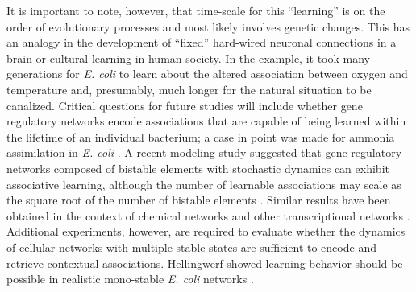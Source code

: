 It is important to note, however, that time-scale for this ``learning'' is on the order of evolutionary processes and most likely involves genetic changes. This has an analogy in the development of ``fixed'' hard-wired neuronal connections in a brain or cultural learning in human society. In the example, it took many generations for \textit{E. coli} to learn about the altered association between oxygen and temperature and, presumably, much longer for the natural situation to be canalized. Critical questions for future studies will include whether gene regulatory networks encode associations that are capable of being learned within the lifetime of an individual bacterium; a case in point was made for ammonia assimilation in \textit{E. coli} \cite{hellingwerf_signal_1995,bruggeman_macromolecular_2000}. A recent modeling study suggested that gene regulatory networks composed of bistable elements with stochastic dynamics can exhibit associative learning, although the number of learnable associations may scale as the square root of the number of bistable elements \cite{sorek_stochasticity_2013}. Similar results have been obtained in the context of chemical networks \cite{mcgregor_evolution_2012} and other transcriptional networks \cite{carrera_computational_2012}. Additional experiments, however, are required to evaluate whether the dynamics of cellular networks with multiple stable states are sufficient to encode and retrieve contextual associations. Hellingwerf showed learning behavior should be possible in realistic mono-stable \textit{E. coli} networks \cite{hellingwerf_signal_1995}.

